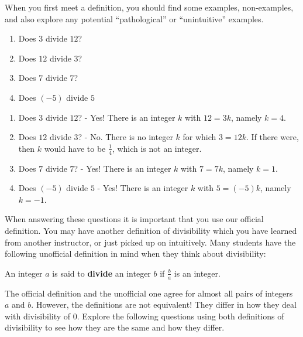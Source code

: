When you first meet a definition, you should find some examples, non-examples, and also explore any potential ``pathological'' or ``unintuitive'' examples.  

\begin{xca}
	\begin{enumerate}
	\item Does $3$ divide $12$? 
	\item Does $12$ divide $3$?  
	\item Does $7$ divide $7$? 
	\item Does $(-5)$ divide  $5$  
	\end{enumerate}
\end{xca}

\begin{solutions}
			\begin{enumerate}
			\item Does $3$ divide $12$?  - Yes!  There is an integer $k$ with $12 = 3k$, namely $k=4$. 
			\item Does $12$ divide $3$?  - No.  There is no integer $k$ for which $3 = 12k$.  If there were, then $k$ would have to be $\frac{1}{4}$, which is not an integer.
			\item Does $7$ divide $7$?  - Yes!  There is an integer $k$ with $7 = 7k$, namely $k=1$. 
			\item Does $(-5)$ divide  $5$  - Yes!  There is an integer $k$ with $5 = (-5)k$, namely $k=-1$.
		\end{enumerate}
	\end{solutions}

When answering these questions it is important that you use our official definition.  You may have another definition of divisibility which you have learned from another instructor, or just picked up on intuitively.  Many students have the following unofficial definition in mind when they think about divisibility:

\medskip

\begin{definition}
	An integer $a$ is said to \textbf{divide} an integer $b$ if $\frac{b}{a}$ is an integer.
\end{definition} 

The official definition and the unofficial one agree for almost all pairs of integers $a$ and $b$.  However, the definitions are not equivalent!  They differ in how they deal with divisibility of $0$.  Explore the following questions using both definitions of divisibility to see how they are the same and how they differ.

